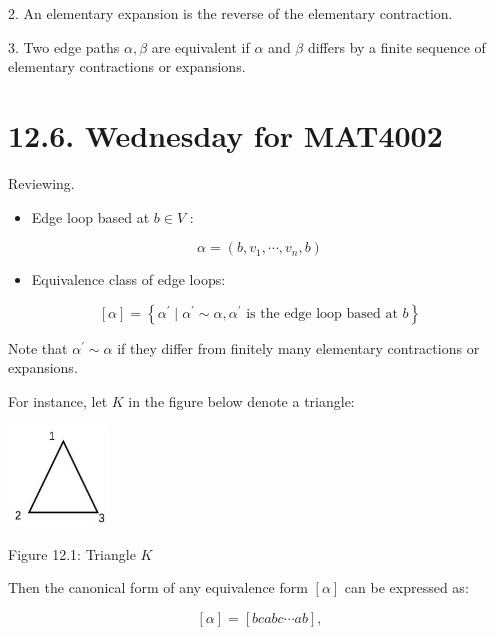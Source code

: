 2. An elementary expansion is the reverse of the elementary contraction.

3. Two edge paths \(\alpha ,\beta\) are equivalent if \(\alpha\) and \(\beta\) differs by a finite sequence of elementary contractions or expansions.

\section*{12.6. Wednesday for MAT4002}

Reviewing.

\begin{itemize}
\item Edge loop based at \(b \in  V\) :
\end{itemize}

\[
\alpha  = \left( {b,{v}_{1},\cdots ,{v}_{n},b}\right)
\]

\begin{itemize}
\item Equivalence class of edge loops:
\end{itemize}

\[
\left\lbrack  \alpha \right\rbrack   = \left\{  {{\alpha }^{\prime } \mid  {\alpha }^{\prime } \sim  \alpha ,{\alpha }^{\prime }\text{ is the edge loop based at }b}\right\}
\]

Note that \({\alpha }^{\prime } \sim  \alpha\) if they differ from finitely many elementary contractions or expansions.

For instance, let \(K\) in the figure below denote a triangle:

\begin{center}
\includegraphics[max width=0.2\textwidth]{images/bo_d2bcsrref24c73avs720_126_729_1128_194_194_0.jpg}
\end{center}
\hspace*{3em} 

Figure 12.1: Triangle \(K\)

Then the canonical form of any equivalence form \(\left\lbrack  \alpha \right\rbrack\) can be expressed as:

\[
\left\lbrack  \alpha \right\rbrack   = \left\lbrack  {{bcabc}\cdots {ab}}\right\rbrack  ,
\]

